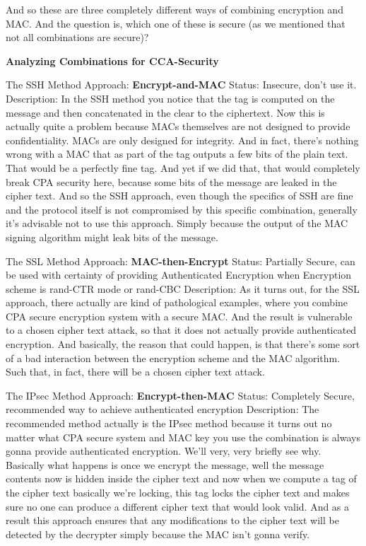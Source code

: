 \documentclass[11pt]{article}
\begin{document}
And so these are three completely different ways of combining encryption
and MAC. And the question is, which one of these is secure (as we
mentioned that not all combinations are secure)?

\textbf{Analyzing Combinations for CCA-Security}

The SSH Method Approach: \textbf{Encrypt-and-MAC} Status: Insecure,
don't use it. Description: In the SSH method you notice that the tag is
computed on the message and then concatenated in the clear to the
ciphertext. Now this is actually quite a problem because MACs themselves
are not designed to provide confidentiality. MACs are only designed for
integrity. And in fact, there's nothing wrong with a MAC that as part of
the tag outputs a few bits of the plain text. That would be a perfectly
fine tag. And yet if we did that, that would completely break CPA
security here, because some bits of the message are leaked in the cipher
text. And so the SSH approach, even though the specifics of SSH are fine
and the protocol itself is not compromised by this specific combination,
generally it's advisable not to use this approach. Simply because the
output of the MAC signing algorithm might leak bits of the message.

The SSL Method Approach: \textbf{MAC-then-Encrypt} Status: Partially
Secure, can be used with certainty of providing Authenticated Encryption
when Encryption scheme is rand-CTR mode or rand-CBC Description: As it
turns out, for the SSL approach, there actually are kind of pathological
examples, where you combine CPA secure encryption system with a secure
MAC. And the result is vulnerable to a chosen cipher text attack, so
that it does not actually provide authenticated encryption. And
basically, the reason that could happen, is that there's some sort of a
bad interaction between the encryption scheme and the MAC algorithm.
Such that, in fact, there will be a chosen cipher text attack.

The IPsec Method Approach: \textbf{Encrypt-then-MAC} Status: Completely
Secure, recommended way to achieve authenticated encryption Description:
The recommended method actually is the IPsec method because it turns out
no matter what CPA secure system and MAC key you use the combination is
always gonna provide authenticated encryption. We'll very, very briefly
see why. Basically what happens is once we encrypt the message, well the
message contents now is hidden inside the cipher text and now when we
compute a tag of the cipher text basically we're locking, this tag locks
the cipher text and makes sure no one can produce a different cipher
text that would look valid. And as a result this approach ensures that
any modifications to the cipher text will be detected by the decrypter
simply because the MAC isn't gonna verify.
\end{document}
